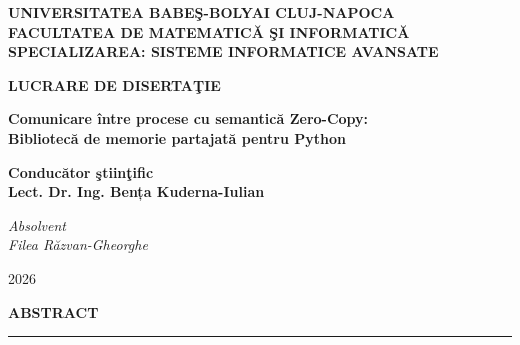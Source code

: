 \documentclass[12pt]{report}
\begin{document}
\begin{titlepage}
\begin{center}
{\Large\textbf{UNIVERSITATEA BABEŞ-BOLYAI CLUJ-NAPOCA}\\[1em]
\textbf{FACULTATEA DE MATEMATICĂ ŞI INFORMATICĂ}\\[1em]
\textbf{SPECIALIZAREA: SISTEME INFORMATICE AVANSATE}}
\end{center}

\vspace{10em}

\begin{center}
    \Huge\textbf{LUCRARE DE DISERTAŢIE}
\end{center}

\vspace{2em}

\begin{center}
    \Large\textbf{Comunicare între procese cu semantică Zero-Copy:\\[0.5em] Bibliotecă de memorie partajată pentru Python}
\end{center}

\vspace{7em}

\begin{flushleft}
{\Large\textbf{Conducător ştiinţific \\ Lect. Dr. Ing. Bența Kuderna-Iulian}}
\end{flushleft}

\vspace{3em}

\begin{flushright}
{\Large\textit{Absolvent\\ Filea Răzvan-Gheorghe}}
\end{flushright}

\vfill

\begin{center}
{\Large{2026}}
\end{center}
\end{titlepage}
\endgroup

\newpage
\thispagestyle{empty}
\mbox{}
\newpage
{}

\cleardoublepage
\textbf{ABSTRACT}
\vspace{0.5cm}
\hrule
\vspace{0.5cm}
\end{document}
